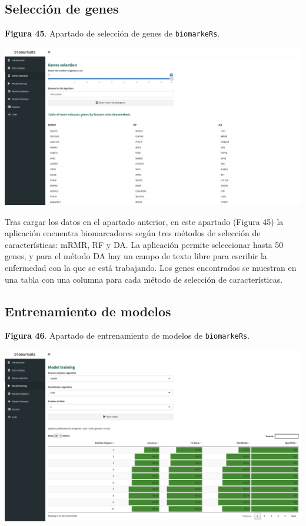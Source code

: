 \subsection{Selección de genes}

\begin{center}
	\textbf{Figura 45}. Apartado de selección de genes de \texttt{biomarkeRs}.
\end{center}

\begin{center}
	\includegraphics[width=.90\textwidth]{figuras/45_genes_selection.png} \\
\end{center}

Tras cargar los datos en el apartado anterior, en este apartado (Figura 45) la aplicación encuentra biomarcadores según tres métodos de selección de características: mRMR, RF y DA. La aplicación permite seleccionar hasta 50 genes, y para el método DA hay un campo de texto libre para escribir la enfermedad con la que se está trabajando. Los genes encontrados se muestran en una tabla con una columna para cada método de selección de características.

\subsection{Entrenamiento de modelos}

\begin{center}
	\textbf{Figura 46}. Apartado de entrenamiento de modelos de \texttt{biomarkeRs}.
\end{center}

\begin{center}
	\includegraphics[width=.90\textwidth]{figuras/46_model_training.png} \\
\end{center}

